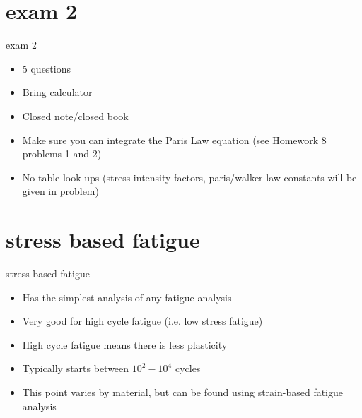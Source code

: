 \documentclass[10pt]{beamer}
\begin{document}
\section{exam 2}

\begin{frame}{exam 2}
	\begin{itemize}[<+->]
		\item 5 questions
		\item Bring calculator
		\item Closed note/closed book
		\item Make sure you can integrate the Paris Law equation (see Homework 8 problems 1 and 2)
		\item No table look-ups (stress intensity factors, paris/walker law constants will be given in problem)
	\end{itemize}
\end{frame}

\section{stress based fatigue}

\begin{frame}{stress based fatigue}
	\begin{itemize}[<+->]
		\item Has the simplest analysis of any fatigue analysis
		\item Very good for high cycle fatigue (i.e. low stress fatigue)
		\item High cycle fatigue means there is less plasticity
		\item Typically starts between $10^2 - 10^4$ cycles
		\item This point varies by material, but can be found using strain-based fatigue analysis
	\end{itemize}
\end{frame}
\end{document}
